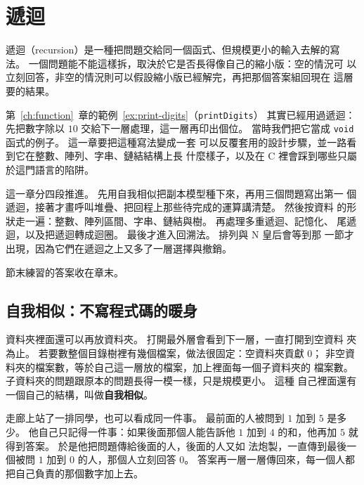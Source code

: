 \chapter{遞迴}
\label{ch:recursion}

遞迴（recursion）是一種把問題交給同一個函式、但規模更小的輸入去解的寫
法。 一個問題能不能這樣拆，取決於它是否長得像自己的縮小版：空的情況可
以立刻回答，非空的情況則可以假設縮小版已經解完，再把那個答案組回現在
這層要的結果。

第~\ref{ch:function}~章的範例~\ref{ex:print-digits}（\texttt{printDigits}）
其實已經用過遞迴：先把數字除以 $10$ 交給下一層處理，這一層再印出個位。
當時我們把它當成 \texttt{void} 函式的例子。 這一章要把這種寫法變成一套
可以反覆套用的設計步驟，並一路看到它在整數、陣列、字串、鏈結結構上長
什麼樣子，以及在 C 裡會踩到哪些只屬於這門語言的陷阱。

這一章分四段推進。 先用自我相似把副本模型種下來，再用三個問題寫出第一
個遞迴，接著才畫呼叫堆疊、把回程上那些待完成的運算講清楚。 然後按資料
的形狀走一遍：整數、陣列區間、字串、鏈結與樹。 再處理多重遞迴、記憶化、
尾遞迴，以及把遞迴轉成迴圈。 最後才進入回溯法。 排列與 N 皇后會等到那
一節才出現，因為它們在遞迴之上又多了一層選擇與撤銷。

節末練習的答案收在章末。

\section{自我相似：不寫程式碼的暖身}
\label{sec:rec-self-sim}

資料夾裡面還可以再放資料夾。 打開最外層會看到下一層，一直打開到空資料
夾為止。 若要數整個目錄樹裡有幾個檔案，做法很固定：空資料夾貢獻 $0$；
非空資料夾的檔案數，等於自己這一層放的檔案，加上裡面每一個子資料夾的
檔案數。 子資料夾的問題跟原本的問題長得一模一樣，只是規模更小。 這種
自己裡面還有一個自己的結構，叫做\textbf{自我相似}。

走廊上站了一排同學，也可以看成同一件事。 最前面的人被問到 $1$ 加到
$5$ 是多少。 他自己只記得一件事：如果後面那個人能告訴他 $1$ 加到 $4$
的和，他再加 $5$ 就得到答案。 於是他把問題傳給後面的人，後面的人又如
法炮製，一直傳到最後一個被問 $1$ 加到 $0$ 的人，那個人立刻回答 $0$。
答案再一層一層傳回來，每一個人都把自己負責的那個數字加上去。

